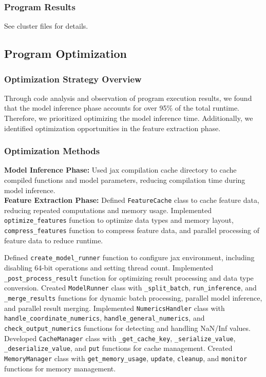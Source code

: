 \documentclass[a4paper,12pt]{article}
\begin{document}
\subsubsection{Program Results}
See cluster files for details.

\subsection{Program Optimization}

\subsubsection{Optimization Strategy Overview}
Through code analysis and observation of program execution results, we found that the model inference phase accounts for over 95\% of the total runtime. Therefore, we prioritized optimizing the model inference time. Additionally, we identified optimization opportunities in the feature extraction phase.

\subsubsection{Optimization Methods}
\textbf{Model Inference Phase:} Used jax compilation cache directory to cache compiled functions and model parameters, reducing compilation time during model inference. \\
\textbf{Feature Extraction Phase:} Defined \texttt{FeatureCache} class to cache feature data, reducing repeated computations and memory usage. Implemented \texttt{optimize\_features} function to optimize data types and memory layout, \texttt{compress\_features} function to compress feature data, and parallel processing of feature data to reduce runtime.

Defined \texttt{create\_model\_runner} function to configure jax environment, including disabling 64-bit operations and setting thread count. Implemented \texttt{\_post\_process\_result} function for optimizing result processing and data type conversion. Created \texttt{ModelRunner} class with \texttt{\_split\_batch}, \texttt{run\_inference}, and \texttt{\_merge\_results} functions for dynamic batch processing, parallel model inference, and parallel result merging. Implemented \texttt{NumericsHandler} class with \texttt{handle\_coordinate\_numerics}, \texttt{handle\_general\_numerics}, and \texttt{check\_output\_numerics} functions for detecting and handling NaN/Inf values. Developed \texttt{CacheManager} class with \texttt{\_get\_cache\_key}, \texttt{\_serialize\_value}, \texttt{\_deserialize\_value}, and \texttt{put} functions for cache management. Created \texttt{MemoryManager} class with \texttt{get\_memory\_usage}, \texttt{update}, \texttt{cleanup}, and \texttt{monitor} functions for memory management.
\end{document}
